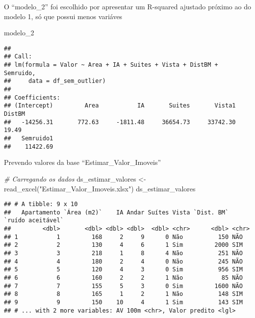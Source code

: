 \documentclass[
]{article}
\newenvironment{Shaded}{\begin{snugshade}}{\end{snugshade}}
\newcommand{\CommentTok}[1]{\textcolor[rgb]{0.56,0.35,0.01}{\textit{#1}}}
\newcommand{\FunctionTok}[1]{\textcolor[rgb]{0.00,0.00,0.00}{#1}}
\newcommand{\NormalTok}[1]{#1}
\newcommand{\OtherTok}[1]{\textcolor[rgb]{0.56,0.35,0.01}{#1}}
\newcommand{\StringTok}[1]{\textcolor[rgb]{0.31,0.60,0.02}{#1}}
\begin{document}
O ``modelo\_2'' foi escolhido por apresentar um R-squared ajustado
próximo ao do modelo 1, só que possui menos variáves

\begin{Shaded}
\begin{Highlighting}[]
\NormalTok{modelo\_2}
\end{Highlighting}
\end{Shaded}

\begin{verbatim}
## 
## Call:
## lm(formula = Valor ~ Area + IA + Suites + Vista + DistBM + Semruido, 
##     data = df_sem_outlier)
## 
## Coefficients:
## (Intercept)         Area           IA       Suites       Vista1       DistBM  
##   -14256.31       772.63     -1811.48     36654.73     33742.30        19.49  
##   Semruido1  
##    11422.69
\end{verbatim}

Prevendo valores da base ``Estimar\_Valor\_Imoveis''

\begin{Shaded}
\begin{Highlighting}[]
\CommentTok{\# Carregando os dados}
\NormalTok{ds\_estimar\_valores }\OtherTok{\textless{}{-}} \FunctionTok{read\_excel}\NormalTok{(}\StringTok{"Estimar\_Valor\_Imoveis.xlsx"}\NormalTok{)}
\NormalTok{ds\_estimar\_valores}
\end{Highlighting}
\end{Shaded}

\begin{verbatim}
## # A tibble: 9 x 10
##   Apartamento `Área (m2)`    IA Andar Suítes Vista `Dist. BM` `ruído aceitável`
##         <dbl>       <dbl> <dbl> <dbl>  <dbl> <chr>      <dbl> <chr>            
## 1           1         168     2     9      0 Não          150 NÃO              
## 2           2         130     4     6      1 Sim         2000 SIM              
## 3           3         218     1     8      4 Não          251 NÃO              
## 4           4         180     2     4      0 Não          245 NÃO              
## 5           5         120     4     3      0 Sim          956 SIM              
## 6           6         160     2     2      1 Não           85 NÃO              
## 7           7         155     5     3      0 Sim         1600 NÃO              
## 8           8         165     1     2      1 Não          148 SIM              
## 9           9         150    10     4      1 Sim          143 SIM              
## # ... with 2 more variables: AV 100m <chr>, Valor predito <lgl>
\end{verbatim}
\end{document}
